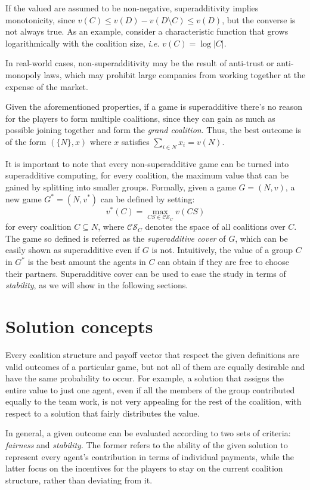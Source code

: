 \documentclass[11pt, twoside, titlepage, a4paper, openright]{report}
\begin{document}
\noindent If the valued are assumed to be non-negative, superadditivity implies monotonicity, since $v(C) \leq v(D) - v(D \setminus C) \leq v(D)$, but the converse is not always true. As an example, consider a characteristic function that grows logarithmically with the coalition size, \textit{i.e.} $v(C)=\log|C|$.

\noindent In real-world cases, non-superadditivity may be the result of anti-trust or anti-monopoly laws, which may prohibit large companies from working together at the expense of the market.

\noindent Given the aforementioned properties, if a game is superadditive there's no reason for the players to form multiple coalitions, since they can gain as much as possible joining together and form the \textit{grand coalition}. Thus, the best outcome is of the form $(\{N\},x)$ where $x$ satisfies $\sum_{i \in N}x_i=v(N)$.

\noindent It is important to note that every non-superadditive game can be turned into superadditive computing, for every coalition, the maximum value that can be gained by splitting into smaller groups. Formally, given a game $G=(N,v)$, a new game $G^*=(N,v^*)$ can be defined by setting: $$v^*(C)=\operatorname*{max}_{CS \in \mathcal{CS}_C}v(CS)$$ for every coalition $C \subseteq N$, where $\mathcal{CS}_C$ denotes the space of all coalitions over $C$.
The game so defined is referred as the \textit{superadditive cover} of $G$, which can be easily shown as superadditive even if $G$ is not. Intuitively, the value of a group $C$ in $G^*$ is the best amount the agents in $C$ can obtain if they are free to choose their partners. Superadditive cover can be used to ease the study in terms of \textit{stability}, as we will show in the following sections.

\section{Solution concepts}

Every coalition structure and payoff vector that respect the given definitions are valid outcomes of a particular game, but not all of them are equally desirable and have the same probability to occur. For example, a solution that assigns the entire value to just one agent, even if all the members of the group contributed equally to the team work, is not very appealing for the rest of the coalition, with respect to a solution that fairly distributes the value.

\noindent In general, a given outcome can be evaluated according to two sets of criteria: \textit{fairness} and \textit{stability}. The former refers to the ability of the given solution to represent every agent's contribution in terms of individual payments, while the latter focus on the incentives for the players to stay on the current coalition structure, rather than deviating from it.
\end{document}

